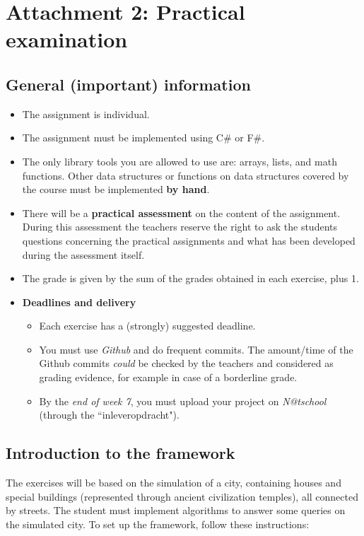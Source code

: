 \section*{Attachment 2: Practical examination}

\subsection*{General (important) information}
\begin{itemize}
\item The assignment is individual.
\item The assignment must be implemented using C\# or F\#.
\item The only library tools you are allowed to use are: arrays, lists, and math functions. Other data structures or functions on data structures covered by the course must be implemented \textbf{by hand}.
\item There will be a \textbf{practical assessment} on the content of the assignment. During this assessment the teachers reserve the right to ask the students questions concerning the practical assignments and what has been developed during the assessment itself.
\item The grade is given by the sum of the grades obtained in each exercise, plus 1.
\item \textbf{Deadlines and delivery}
\begin{itemize}
\item Each exercise has a (strongly) suggested deadline.
\item You must use \textit{Github} and do frequent commits. The amount/time of the Github commits \textit{could} be checked by the teachers and considered as grading evidence, for example in case of a borderline grade.
\item By the \textit{end of week 7}, you must upload your project on \textit{N@tschool} (through the ``inleveropdracht").
\end{itemize}
\end{itemize}

\subsection*{Introduction to the framework}
The exercises will be based on the simulation of a city, containing houses and special buildings (represented through ancient civilization temples), all connected by streets. The student must implement algorithms to answer some queries on the simulated city.
To set up the framework, follow these instructions:

